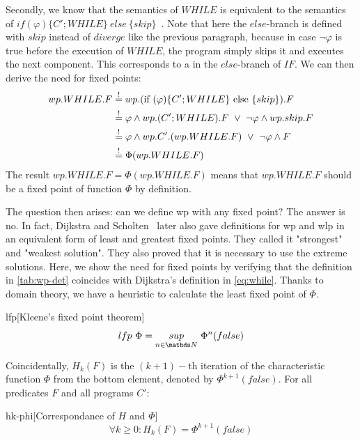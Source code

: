 Secondly, we know that the semantics of $WHILE$ is equivalent to the semantics of $if(\varphi)\{C';WHILE\}\ else\ \{skip\}$~\cite{lukkien1994OperationalSemanticsGeneralized}. 
Note that here the $else$-branch is defined with $skip$ instead of $diverge$ like the previous paragraph, because in case $\neg\varphi$ is true before the execution of $WHILE$, the program simply skips it and executes the next component. 
This corresponds to a  in the $else$-branch of $IF$. 
We can then derive the need for fixed points: 
\begin{align*} 
  wp.WHILE.F    & \seq wp.(\text{if }(\varphi)\{C';WHILE\}\text{ else }\{skip\}).F \\
                & \seq \varphi\wedge wp.(C';WHILE).F \ \vee \ \neg\varphi\wedge wp.skip.F\\ 
                & \seq \varphi\wedge wp.C'.(wp.WHILE.F)\ \vee\ \neg\varphi\wedge F\\ 
                & \seq \Phi(wp.WHILE.F)\\ 
\end{align*}
The result $wp.WHILE.F = \Phi(wp.WHILE.F)$ means that $wp.WHILE.F$ should be a fixed point of function $\Phi$ by definition.

The question then arises: can we define wp with any fixed point? 
The answer is no. 
In fact, Dijkstra and Scholten~\cite{dijkstra90} later also gave definitions for wp and wlp in an equivalent form of least and greatest fixed points. 
They called it "strongest" and "weakest solution". 
They also proved that it is necessary to use the extreme solutions.
Here, we show the need for  fixed points by verifying that the definition in \autoref{tab:wp-det} coincides with Dijkstra's definition in \autoref{eq:while}.
Thanks to domain theory, we have a heuristic to calculate the least fixed point of $\Phi$. 

\begin{theorem}{lfp}[Kleene's fixed point theorem]~{\normalfont\cite{kaminski19}}
$$lfp\ \Phi = \underset{n\in\N}{sup}\ \Phi^n(false)$$
\end{theorem}

Coincidentally, $H_k(F)$ is the $(k+1)-$th iteration of the characteristic function $\Phi$ from the bottom element, denoted by $\Phi^{k+1}(false)$. 
For all predicates $F$ and all programs $C'$: 
\begin{lemma}{hk-phi}[Correspondance of $H$ and $\Phi$]
$$\forall k\geq 0: H_k(F)=\Phi^{k+1}(false)$$
\end{lemma}

